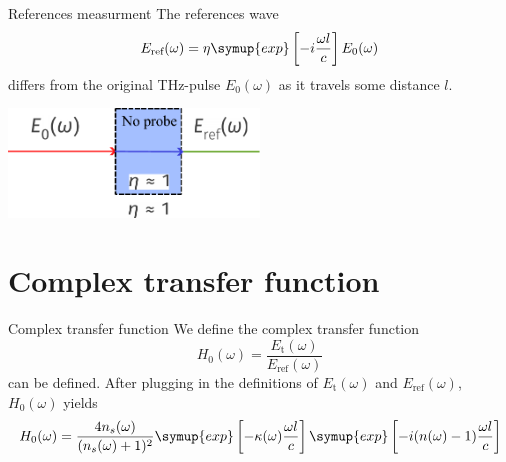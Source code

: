 \documentclass[aspectratio=1610, 9pt]{beamer}
\begin{document}
\begin{frame}{References measurment}
  The references wave 
  \begin{equation}
  E_\text{ref}(\omega) = \eta \symup{exp}\left[ -i \frac{\omega l }{c}\right] E_0(\omega)  
  \end{equation}
  differs from the original THz-pulse $E_0(\omega)$ as it travels some distance $l$.
  \begin{center}
  \includegraphics[width=0.5\textwidth]{images/reference.pdf}
  \end{center}
\end{frame}

\section{Complex transfer function}
\begin{frame}{Complex transfer function}
  We define the complex transfer function 
  \begin{equation}
    H_0(\omega) = \frac{E_\text{t}(\omega)}{E_\text{ref}(\omega)}
  \end{equation}
  can be defined.
  After plugging in the definitions of $E_\text{t}(\omega)$ and $E_\text{ref}(\omega)$, $H_0(\omega)$ yields
  \begin{equation}
    H_0 (\omega) = \frac{4 n_s(\omega)}{(n_s(\omega) +1)^2} \symup{exp}\left[-\kappa(\omega) \frac{\omega l }{c}\right] \symup{exp}\left[-i (n (\omega) - 1) \frac{\omega l}{c}\right]
  \end{equation}
  \end{frame}
\end{document}
